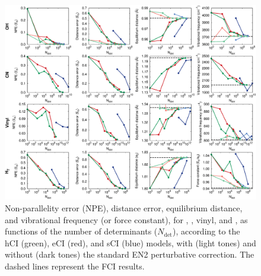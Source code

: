 \documentclass[aip,jcp,reprint,noshowkeys,superscriptaddress]{revtex4-1}
\newcommand{\Ndet}{N_\text{det}}
\begin{document}
\begin{figure}%
\includegraphics[width=1.0\linewidth]{plot_all}
\caption{
Non-parallelity error (NPE), distance error, equilibrium distance, and vibrational frequency (or force constant), for , , vinyl, and ,
as functions of the number of determinants ($\Ndet$), according to the hCI (green), eCI (red), and sCI (blue) models,
with (light tones) and without (dark tones) the standard EN2 perturbative correction.
The dashed lines represent the FCI results.}
\label{fig:plot_all}
\end{figure}
\end{document}

